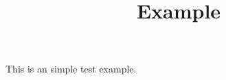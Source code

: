 \documentclass{article}
\title{Example}
\begin{document}
\maketitle
This is an simple test\cite{Muster2021} example.
\printbibliography
\end{document}
